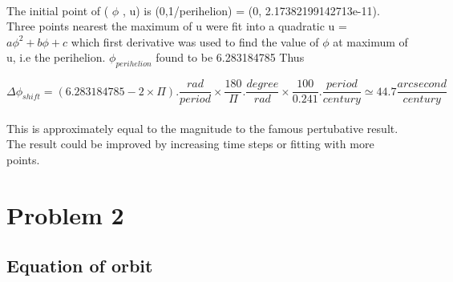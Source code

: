 \paragraph{}
The initial point of ( $\phi$ , u) is (0,1/perihelion) = (0, 2.17382199142713e-11).
Three points nearest the maximum of u were fit into a quadratic u = $a\phi^2+b\phi+c$ which first derivative was used to find the value of $\phi$ at maximum of u, i.e the perihelion.
$\phi_{perihelion}$ found to be 6.283184785 
Thus 

\begin{equation}
\Delta \phi_{shift} = ( 6.283184785- 2 \times \Pi ). \frac{rad}{period}   \times \frac{180}{\Pi} .\frac{degree}{rad} \times  \frac{100}{0.241 }.\frac{period}{century}  \simeq 44.7 \frac{arcsecond}{century}
\end{equation}
\paragraph{}
This is approximately equal to the magnitude to the famous pertubative result. The result could be improved by increasing time steps or fitting with more points.

\section{Problem 2}
\subsection{Equation of orbit}
